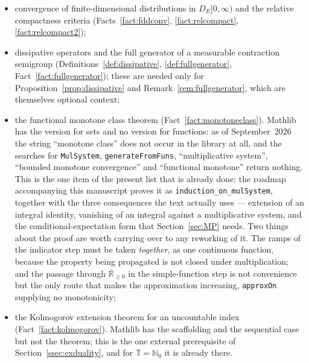 \documentclass[11pt,a4paper]{article}
\theoremstyle{plain}
\theoremstyle{definition}
\theoremstyle{remark}
\newcommand{\R}{\mathbb{R}}
\newcommand{\N}{\mathbb{N}}
\newcommand{\T}{\mathbb{T}}                     %
\newcommand{\Prob}{\mathcal{P}}                %
\newcommand{\DE}{D_E[0,\infty)}
\newcommand{\Ku}{\cite{Kurtz91}}
\begin{document}
\begin{itemize}
  spaces, by Remark~\ref{rem:MZcost}.  The almost everywhere continuous half of
  Fact~\ref{fact:cmt} is formalized, as are the separability and second
  countability of $\Prob(S)$; what remains is the representation itself, and the
  space $M_E$ of that remark, whose separability is the one step \Ku{} leaves to
  the reader;
\item convergence of finite-dimensional distributions in $\DE$ and the relative
  compactness criteria (Facts~\ref{fact:fddconv}, \ref{fact:relcompact},
  \ref{fact:relcompact2});
\item dissipative operators and the full generator of a measurable contraction
  semigroup (Definitions~\ref{def:dissipative}, \ref{def:fullgenerator},
  Fact~\ref{fact:fullgenerator}); these are needed only for
  Proposition~\ref{prop:dissipative} and Remark~\ref{rem:fullgenerator}, which
  are themselves optional context;
\item the functional monotone class theorem (Fact~\ref{fact:monotoneclass}).
  Mathlib has the version for sets and no version for functions: as of
  September~2026 the string ``monotone class'' does not occur in the library at
  all, and the searches for \texttt{MulSystem}, \texttt{generateFrom}\allowbreak\texttt{Funs},
  ``multiplicative system'', ``bounded monotone convergence'' and ``functional
  monotone'' return nothing.  This is the one item of the present list that is
  already done: the roadmap accompanying this manuscript proves it as
  \texttt{induction\_on\_}\allowbreak\texttt{mulSystem}, together with the three consequences the
  text actually uses --- extension of an integral identity, vanishing of an
  integral against a multiplicative system, and the conditional-expectation form
  that Section~\ref{sec:MP} needs.  Two things about the proof are worth
  carrying over to any reworking of it.  The ramps of the indicator step must be
  taken \emph{together}, as one continuous function, because the property being
  propagated is not closed under multiplication; and the passage through
  $\overline{\R}_{\geq 0}$ in the simple-function step is not convenience but
  the only route that makes the approximation increasing, \texttt{approxOn}
  supplying no monotonicity;
\item the Kolmogorov extension theorem for an uncountable index
  (Fact~\ref{fact:kolmogorov}).  Mathlib has the scaffolding and the sequential
  case but not the theorem; this is the one external prerequisite of
  Section~\ref{ssec:exduality}, and for $\T = \N_0$ it is already there.
\end{itemize}
\end{document}
